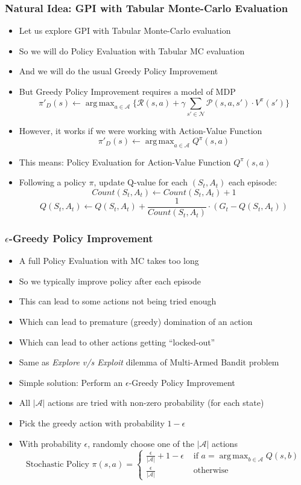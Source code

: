 \documentclass[handout]{beamer}
\DeclareMathOperator*{\argmax}{arg\,max}
\begin{document}
\begin{frame}
\frametitle{Natural Idea: GPI with Tabular Monte-Carlo Evaluation}
\begin{itemize}[<+->]
\item Let us explore GPI with Tabular Monte-Carlo evaluation
\item So we will do Policy Evaluation with Tabular MC evaluation
\item And we will do the usual Greedy Policy Improvement
\item But Greedy Policy Improvement requires a model of MDP
$$\pi'_D(s) \leftarrow  \argmax_{a\in \mathcal{A}} \{\mathcal{R}(s,a) + \gamma \sum_{s' \in \mathcal{N}} \mathcal{P}(s,a,s') \cdot V^{\pi}(s') \}$$
\item However, it works if we were working with Action-Value Function
$$\pi'_D(s) \leftarrow \argmax_{a\in \mathcal{A}} Q^{\pi}(s,a)$$
\item This means: Policy Evaluation for Action-Value Function $Q^{\pi}(s,a)$
\item Following a policy $\pi$, update Q-value for each $(S_t,A_t)$ each episode:
$$Count(S_t,A_t) \leftarrow Count(S_t,A_t) + 1$$
$$Q(S_t,A_t) \leftarrow Q(S_t,A_t) + \frac 1 {Count(S_t, A_t)} \cdot (G_t - Q(S_t,A_t))$$
\end{itemize}
\end{frame}

\begin{frame}
\frametitle{$\epsilon$-Greedy Policy Improvement}
\begin{itemize}[<+->]
\item A full Policy Evaluation with MC takes too long
\item So we typically improve policy after each episode
\item This can lead to some actions not being tried enough
\item Which can lead to premature (greedy) domination of an action
\item Which can lead to other actions getting ``locked-out''
\item Same as {\em Explore v/s Exploit} dilemma of Multi-Armed Bandit problem
\item Simple solution: Perform an $\epsilon$-Greedy Policy Improvement
\item All $|\mathcal{A}|$ actions are tried with non-zero probability (for each state)
\item Pick the greedy action with probability $1-\epsilon$
\item With probability $\epsilon$, randomly choose one of the $|\mathcal{A}|$ actions
$$\text{Stochastic Policy } \pi(s,a) = 
\begin{cases}
\frac {\epsilon} {|\mathcal{A}|} + 1 - \epsilon & \text{ if } a = \argmax_{b \in \mathcal{A}} Q(s, b) \\
\frac {\epsilon} {|\mathcal{A}|} & \text{ otherwise}
\end{cases}
$$
\end{itemize}
\end{frame}
\end{document}
